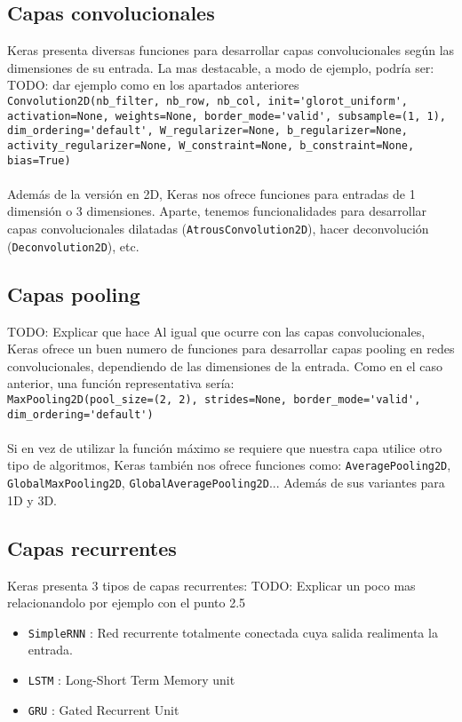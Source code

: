 \subsection{Capas convolucionales}
Keras presenta diversas funciones para desarrollar capas convolucionales según las dimensiones de su entrada. La mas destacable, a modo de ejemplo, podría ser:\\
TODO: dar ejemplo como en los apartados anteriores
\lstinline{Convolution2D(nb_filter, nb_row, nb_col, init='glorot_uniform', activation=None, weights=None, border_mode='valid', subsample=(1, 1), dim_ordering='default', W_regularizer=None, b_regularizer=None, activity_regularizer=None, W_constraint=None, b_constraint=None, bias=True)}\\\\
Además de la versión en 2D, Keras nos ofrece funciones para entradas de 1 dimensión o 3 dimensiones. Aparte, tenemos funcionalidades para desarrollar capas convolucionales dilatadas (\lstinline{AtrousConvolution2D}), hacer deconvolución (\lstinline{Deconvolution2D}), etc.
\subsection{Capas pooling}
TODO: Explicar que hace
Al igual que ocurre con las capas convolucionales, Keras ofrece un buen numero de funciones para desarrollar capas pooling en redes convolucionales, dependiendo de las dimensiones de la entrada. Como en el caso anterior, una función representativa sería:\\
\lstinline{MaxPooling2D(pool_size=(2, 2), strides=None, border_mode='valid', dim_ordering='default')}\\\\
Si en vez de utilizar la función máximo se requiere que nuestra capa utilice otro tipo de algoritmos, Keras también nos ofrece funciones como: \lstinline{AveragePooling2D}, \lstinline{GlobalMaxPooling2D}, \lstinline{GlobalAveragePooling2D}... Además de sus variantes para 1D y 3D.
\subsection{Capas recurrentes}
Keras presenta 3 tipos de capas recurrentes:
TODO: Explicar un poco mas relacionandolo por ejemplo con el punto 2.5
\begin{itemize}[noitemsep]
\item \lstinline{SimpleRNN} : Red recurrente totalmente conectada cuya salida realimenta la entrada.
\item \lstinline{LSTM} : Long-Short Term Memory unit
\item \lstinline{GRU} : Gated Recurrent Unit
\end{itemize}

